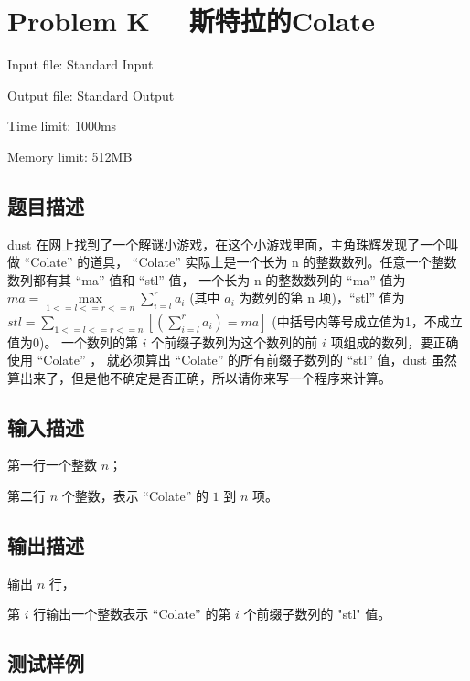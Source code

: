 \newpage
\section{Problem K \ \ 斯特拉的Colate}
{ \limitfont{}
Input file: Standard Input \par
Output file: Standard Output \par
Time limit: 1000ms \par
Memory limit: 512MB \par
}
\subsection*{题目描述}

dust 在网上找到了一个解谜小游戏，在这个小游戏里面，主角珠辉发现了一个叫做 ``Colate'' 的道具， 
``Colate'' 实际上是一个长为 n 的整数数列。任意一个整数数列都有其 ``ma'' 值和 ``stl'' 值，
一个长为 n 的整数数列的 ``ma'' 值为 $ma = \max\limits_{1<=l<=r<=n}\sum\limits_{i = l}^r a_i$ 
(其中 $a_i$ 为数列的第 n 项)，``stl'' 值为$stl = \sum\limits_{1<=l<=r<=n} \left[ (\sum\limits_{i=l}^r a_i) = ma\right]$ (中括号内等号成立值为1，不成立值为0)。
一个数列的第 $i$ 个前缀子数列为这个数列的前 $i$ 项组成的数列，要正确使用 ``Colate'' ，
就必须算出 ``Colate'' 的所有前缀子数列的 ``stl'' 值，dust 虽然算出来了，但是他不确定是否正确，所以请你来写一个程序来计算。

\subsection*{输入描述}

第一行一个整数 $n$；

第二行 $n$ 个整数，表示 ``Colate'' 的 $1$ 到 $n$ 项。

\subsection*{输出描述}

输出 $n$ 行，

第 $i$ 行输出一个整数表示 ``Colate'' 的第 $i$ 个前缀子数列的 "stl" 值。

\subsection*{测试样例}

